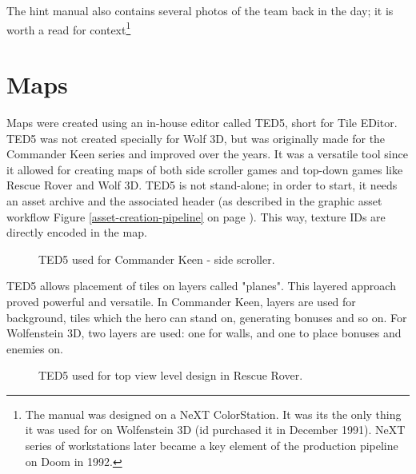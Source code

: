 \documentclass[book.tex]{subfiles}
\begin{document}
     \begin{figure}[H]
\centering
   \end{figure}


\par 
The hint manual also contains several photos of the team back in the day; it is worth a read for context\footnote{The manual was designed on a NeXT ColorStation. It was its the only thing it was used for on Wolfenstein 3D (id purchased it in December 1991). NeXT series of workstations later became a key element of the production pipeline on Doom in 1992.}













\section{Maps}
Maps were created using an in-house editor called TED5, short for Tile EDitor. TED5 was not created specially for Wolf 3D, but was originally made for the Commander Keen series and improved over the years. It was a versatile tool since it allowed for creating maps of both side scroller games and top-down games like Rescue Rover and Wolf 3D. TED5 is not stand-alone; in order to start, it needs an asset archive and the  associated header (as described in the graphic asset workflow Figure \ref{asset-creation-pipeline} on page \pageref{asset-creation-pipeline}). This way, texture IDs are directly encoded in the map.\\

 \begin{figure}[H]
\centering
 \end{figure}

  \begin{figure}[H]
\centering

 \end{figure}


 \begin{figure}[H]
\centering
 \caption{TED5 used for Commander Keen - side scroller.} 
 \end{figure}

TED5 allows placement of tiles on layers called "planes". This layered approach proved powerful and versatile. In Commander Keen, layers are used for background, tiles which the hero can stand on, generating bonuses and so on. For Wolfenstein 3D, two layers are used: one for walls, and one to place bonuses and enemies on.\\
\begin{figure}[H]
\centering
 \caption{TED5 used for top view level design in Rescue Rover.} 
 \end{figure}
\end{document}
